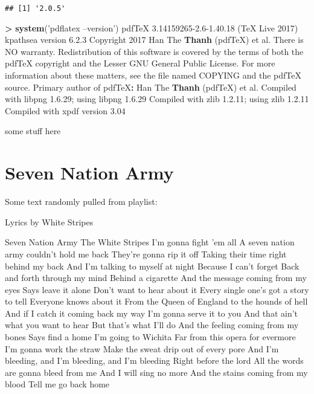 \documentclass[numberinsequence]{krantz}
\makeatletter
\newenvironment{Shaded}{\begin{snugshade}}{\end{snugshade}}
\newcommand{\DecValTok}[1]{\textcolor[rgb]{0.00,0.00,0.81}{#1}}
\newcommand{\FloatTok}[1]{\textcolor[rgb]{0.00,0.00,0.81}{#1}}
\newcommand{\KeywordTok}[1]{\textcolor[rgb]{0.13,0.29,0.53}{\textbf{#1}}}
\newcommand{\NormalTok}[1]{#1}
\newcommand{\OperatorTok}[1]{\textcolor[rgb]{0.81,0.36,0.00}{\textbf{#1}}}
\newcommand{\StringTok}[1]{\textcolor[rgb]{0.31,0.60,0.02}{#1}}
\newenvironment{kframe}{%
\medskip{}
\setlength{\fboxsep}{.8em}
 \def\at@end@of@kframe{}%
 \ifinner\ifhmode%
  \def\at@end@of@kframe{\end{minipage}}%
  \begin{minipage}{\columnwidth}%
 \fi\fi%
 \def\FrameCommand##1{\hskip\@totalleftmargin \hskip-\fboxsep
 \colorbox{shadecolor}{##1}\hskip-\fboxsep
     \hskip-\linewidth \hskip-\@totalleftmargin \hskip\columnwidth}%
 \MakeFramed {\advance\hsize-\width
   \@totalleftmargin\z@ \linewidth\hsize
   \@setminipage}}%
 {\par\unskip\endMakeFramed%
 \at@end@of@kframe}
\renewenvironment{Shaded}{\begin{kframe}}{\end{kframe}}
\makeatother
\begin{document}
\begin{verbatim}
## [1] '2.0.5'
\end{verbatim}

\begin{Shaded}
\begin{Highlighting}[]
\OperatorTok{>}\StringTok{ }\KeywordTok{system}\NormalTok{(}\StringTok{'pdflatex --version'}\NormalTok{)}
\NormalTok{pdfTeX }\FloatTok{3.14159265-2.6}\DecValTok{-1}\NormalTok{.}\FloatTok{40.18}\NormalTok{ (TeX Live }\DecValTok{2017}\NormalTok{)}
\NormalTok{kpathsea version }\DecValTok{6}\NormalTok{.}\FloatTok{2.3}
\NormalTok{Copyright }\DecValTok{2017}\NormalTok{ Han The }\KeywordTok{Thanh}\NormalTok{ (pdfTeX) et al.}
\NormalTok{There is NO warranty.  Redistribution of this software is}
\NormalTok{covered by the terms of both the pdfTeX copyright and}
\NormalTok{the Lesser GNU General Public License.}
\NormalTok{For more information about these matters, see the file}
\NormalTok{named COPYING and the pdfTeX source.}
\NormalTok{Primary author of pdfTeX}\OperatorTok{:}\StringTok{ }\NormalTok{Han The }\KeywordTok{Thanh}\NormalTok{ (pdfTeX) et al.}
\NormalTok{Compiled with libpng }\DecValTok{1}\NormalTok{.}\FloatTok{6.29}\NormalTok{; using libpng }\DecValTok{1}\NormalTok{.}\FloatTok{6.29}
\NormalTok{Compiled with zlib }\DecValTok{1}\NormalTok{.}\FloatTok{2.11}\NormalTok{; using zlib }\DecValTok{1}\NormalTok{.}\FloatTok{2.11}
\NormalTok{Compiled with xpdf version }\FloatTok{3.04}
\end{Highlighting}
\end{Shaded}

\mainmatter

some stuff here

\hypertarget{intro-intro}{%
\chapter{Seven Nation Army}\label{intro-intro}}

Some text randomly pulled from playlist:

Lyrics by White Stripes

Seven Nation Army The White Stripes I'm gonna fight 'em all A seven
nation army couldn't hold me back They're gonna rip it off Taking their
time right behind my back And I'm talking to myself at night Because I
can't forget Back and forth through my mind Behind a cigarette And the
message coming from my eyes Says leave it alone Don't want to hear about
it Every single one's got a story to tell Everyone knows about it From
the Queen of England to the hounds of hell And if I catch it coming back
my way I'm gonna serve it to you And that ain't what you want to hear
But that's what I'll do And the feeling coming from my bones Says find a
home I'm going to Wichita Far from this opera for evermore I'm gonna
work the straw Make the sweat drip out of every pore And I'm bleeding,
and I'm bleeding, and I'm bleeding Right before the lord All the words
are gonna bleed from me And I will sing no more And the stains coming
from my blood Tell me go back home
\end{document}
